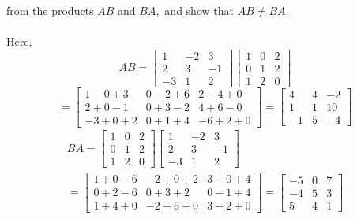  \begin{answer}
 	from the products $A B$ and $B A,$ and show that $A B \neq B A$.\\
 \\Here,
 $$
 A B=\left[\begin{array}{rrr}
 	1 & -2 & 3 \\
 	2 & 3 & -1 \\
 	-3 & 1 & 2
 \end{array}\right]\left[\begin{array}{lll}
 	1 & 0 & 2 \\
 	0 & 1 & 2 \\
 	1 & 2 & 0
 \end{array}\right]
 $$
 $$
 =\left[\begin{array}{ccc}
 	1-0+3 & 0-2+6 & 2-4+0 \\
 	2+0-1 & 0+3-2 & 4+6-0 \\
 	-3+0+2 & 0+1+4 & -6+2+0
 \end{array}\right]=\left[\begin{array}{rrr}
 	4 & 4 & -2 \\
 	1 & 1 & 10 \\
 	-1 & 5 & -4
 \end{array}\right]
 $$$$
 \begin{array}{l}
 	B A=\left[\begin{array}{lll}
 		1 & 0 & 2 \\
 		0 & 1 & 2 \\
 		1 & 2 & 0
 	\end{array}\right]\left[\begin{array}{rrr}
 		1 & -2 & 3 \\
 		2 & 3 & -1 \\
 		-3 & 1 & 2
 	\end{array}\right]\\=\left[\begin{array}{ccc}
 		1+0-6 & -2+0+2 & 3-0+4 \\
 		0+2-6 & 0+3+2 & 0-1+4 \\
 		1+4+0 & -2+6+0 & 3-2+0
 	\end{array}\right]=\left[\begin{array}{rrr}
 		-5 & 0 & 7 \\
 		-4 & 5 & 3 \\
 		5 & 4 & 1
 	\end{array}\right] 
 	
 \end{array}
 $$
 
 \end{answer}
 


